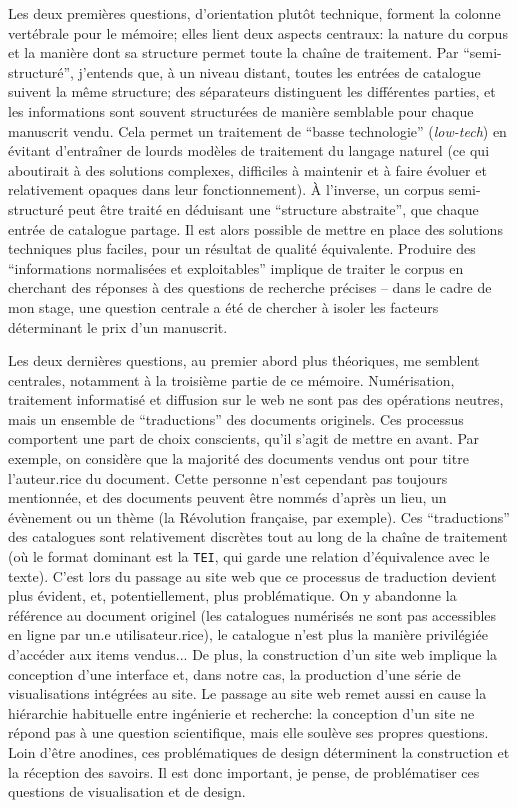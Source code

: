 \documentclass[a4paper, 12pt, twoside]{book}
\newcommand{\tei}{\texttt{TEI}}
\begin{document}
Les deux premières questions, d'orientation plutôt technique, forment la colonne vertébrale pour le mémoire; elles lient deux aspects centraux: la nature du corpus et la manière dont sa structure permet toute la chaîne de traitement. Par \enquote{semi-structuré}, j'entends que, à un niveau distant, toutes les entrées de catalogue suivent la même structure; des séparateurs distinguent les différentes parties, et les informations sont souvent structurées de manière semblable pour chaque manuscrit vendu. Cela permet un traitement de \enquote{basse technologie} (\emph{low-tech}) en évitant d'entraîner de lourds modèles de traitement du langage naturel (ce qui aboutirait à des solutions complexes, difficiles à maintenir et à faire évoluer et relativement opaques dans leur fonctionnement). À l'inverse, un corpus semi-structuré peut être traité en déduisant une \enquote{structure abstraite}, que chaque entrée de catalogue partage. Il est alors possible de mettre en place des solutions techniques plus faciles, pour un résultat de qualité équivalente. Produire des \enquote{informations normalisées et exploitables} implique de traiter le corpus en cherchant des réponses à des questions de recherche précises -- dans le cadre de mon stage, une question centrale a été de chercher à isoler les facteurs déterminant le prix d'un manuscrit.

Les deux dernières questions, au premier abord plus théoriques, me semblent centrales, notamment à la troisième partie de ce mémoire. Numérisation, traitement informatisé et diffusion sur le web ne sont pas des opérations neutres, mais un ensemble de \enquote{traductions} des documents originels. Ces processus comportent une part de choix conscients, qu'il s'agit de mettre en avant. Par exemple, on considère que la majorité des documents vendus ont pour titre l'auteur.rice du document. Cette personne n'est cependant pas toujours mentionnée, et des documents peuvent être nommés d'après un lieu, un évènement ou un thème (la Révolution française, par exemple). Ces \enquote{traductions} des catalogues sont relativement discrètes tout au long de la chaîne de traitement (où le format dominant est la \tei{}, qui garde une relation d'équivalence avec le texte). C'est lors du  passage au site web que ce processus de traduction devient plus évident, et, potentiellement, plus problématique. On y abandonne la référence au document originel (les catalogues numérisés ne sont pas accessibles en ligne par un.e utilisateur.rice), le catalogue n'est plus la manière privilégiée d'accéder aux items vendus... De plus, la construction d'un site web implique la conception d'une interface et, dans notre cas, la production d'une série de visualisations intégrées au site. Le passage au site web remet aussi en cause la hiérarchie habituelle entre ingénierie et recherche: la conception d'un site ne répond pas à une question scientifique, mais elle soulève ses propres questions. Loin d'être anodines, ces problématiques de design déterminent la construction et la réception des savoirs. Il est donc important, je pense, de problématiser ces questions de visualisation et de design.
\end{document}
